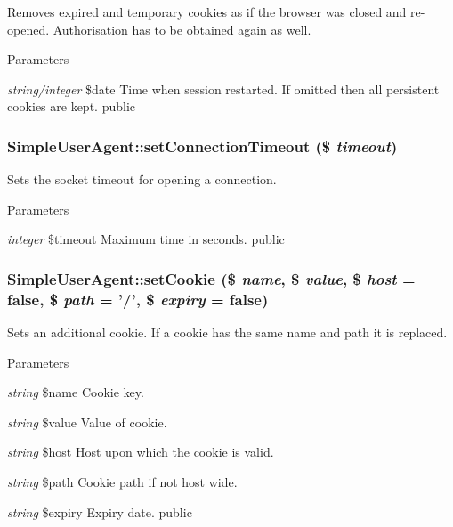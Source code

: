 \label{class_simple_user_agent_a332656f2f3bab01a7a25c9ce28dc6995}
Removes expired and temporary cookies as if the browser was closed and re-\/opened. Authorisation has to be obtained again as well. 
\begin{DoxyParams}{Parameters}
\item[{\em string/integer}]\$date Time when session restarted. If omitted then all persistent cookies are kept.  public \end{DoxyParams}
\hypertarget{class_simple_user_agent_ac7646142526e790424dbde1141c2ef5a}{
\subsubsection[{setConnectionTimeout}]{\setlength{\rightskip}{0pt plus 5cm}SimpleUserAgent::setConnectionTimeout (\$ {\em timeout})}}
\label{class_simple_user_agent_ac7646142526e790424dbde1141c2ef5a}
Sets the socket timeout for opening a connection. 
\begin{DoxyParams}{Parameters}
\item[{\em integer}]\$timeout Maximum time in seconds.  public \end{DoxyParams}
\hypertarget{class_simple_user_agent_aca17a7847aedf88f1f0b75adbf708cc8}{
\subsubsection[{setCookie}]{\setlength{\rightskip}{0pt plus 5cm}SimpleUserAgent::setCookie (\$ {\em name}, \/  \$ {\em value}, \/  \$ {\em host} = {\ttfamily false}, \/  \$ {\em path} = {\ttfamily '/'}, \/  \$ {\em expiry} = {\ttfamily false})}}
\label{class_simple_user_agent_aca17a7847aedf88f1f0b75adbf708cc8}
Sets an additional cookie. If a cookie has the same name and path it is replaced. 
\begin{DoxyParams}{Parameters}
\item[{\em string}]\$name Cookie key. \item[{\em string}]\$value Value of cookie. \item[{\em string}]\$host Host upon which the cookie is valid. \item[{\em string}]\$path Cookie path if not host wide. \item[{\em string}]\$expiry Expiry date.  public \end{DoxyParams}
